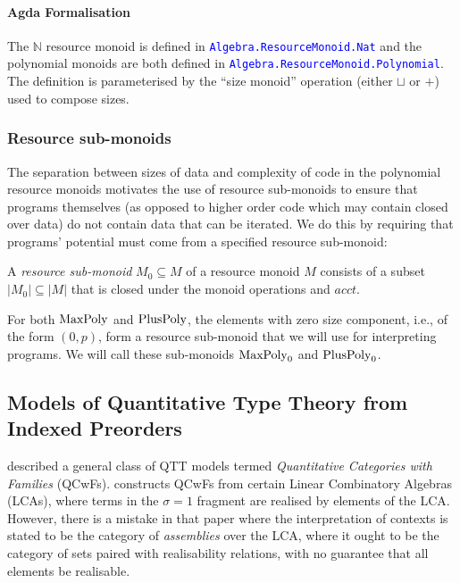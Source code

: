 \documentclass[acmsmall,screen]{acmart}
\newcommand{\AgdaModule}[1]{\textcolor{blue}{\tt #1}}
\begin{document}
\paragraph{Agda Formalisation} The $\mathbb{N}$ resource monoid is
defined in \AgdaModule{Algebra.ResourceMonoid.Nat} and the polynomial
monoids are both defined in
\AgdaModule{Algebra.ResourceMonoid.Polynomial}. The definition is
parameterised by the ``size monoid'' operation (either $\sqcup$ or
$+$) used to compose sizes.

\subsubsection{Resource sub-monoids}

The separation between sizes of data and complexity of code in the
polynomial resource monoids motivates the use of resource sub-monoids
to ensure that programs themselves (as opposed to higher order code
which may contain closed over data) do not contain data that can be
iterated. We do this by requiring that programs' potential must come
from a specified resource sub-monoid:

\begin{definition}
  A \emph{resource sub-monoid} $M_0 \subseteq M$ of a resource monoid
  $M$ consists of a subset $|M_0| \subseteq |M|$ that is closed under
  the monoid operations and $\mathit{acct}$.
\end{definition}

For both $\mathrm{MaxPoly}$ and $\mathrm{PlusPoly}$, the elements with zero size
component, i.e., of the form $(0,p)$, form a resource sub-monoid that
we will use for interpreting programs. We will call these sub-monoids
$\mathrm{MaxPoly}_0$ and $\mathrm{PlusPoly}_0$.

\subsection{Models of Quantitative Type Theory from Indexed Preorders}
\label{sec:qtt-models}

\citet{atkey18qtt} described a general class of QTT models termed
\emph{Quantitative Categories with Families}
(QCwFs). \citet{atkey18qtt} constructs QCwFs from certain Linear
Combinatory Algebras (LCAs), where terms in the $\sigma = 1$ fragment
are realised by elements of the LCA. However, there is a mistake in
that paper where the interpretation of contexts is stated to be the
category of \emph{assemblies} over the LCA, where it ought to be the
category of sets paired with realisability relations, with no
guarantee that all elements be realisable.
\end{document}
